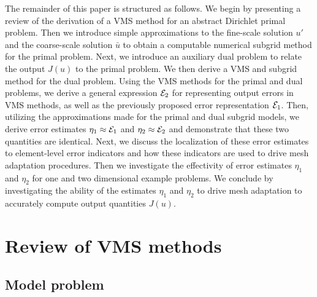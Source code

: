 The remainder of this paper is structured as follows.
We begin by presenting a review of the derivation
of a VMS method for an abstract Dirichlet primal problem.
Then we introduce simple approximations to the fine-scale
solution $u'$ and the coarse-scale solution $\bar{u}$
to obtain a computable numerical subgrid method for
the primal problem. Next, we introduce an auxiliary
dual problem to relate the output $J(u)$ to the primal
problem. We then derive a VMS and subgrid method for the
dual problem. Using the VMS methods for the primal and
dual problems, we derive a general expression $\mathcal{E}_2$ for
representing output errors in VMS methods, as well as
the previously proposed error representation $\mathcal{E}_1$.
Then, utilizing the approximations made for the primal
and dual subgrid models, we derive error estimates
$\eta_1 \approx \mathcal{E}_1$ and $\eta_2 \approx \mathcal{E}_2$
and demonstrate that these two quantities are identical.
Next, we discuss the localization of these error estimates
to element-level error indicators and how these indicators
are used to drive mesh adaptation procedures. Then we
investigate the effectivity of
error estimates $\eta_1$ and $\eta_2$ for one and
two dimensional example problems. We conclude by
investigating the ability of the estimates $\eta_1$
and $\eta_2$ to drive mesh adaptation to accurately
compute output quantities $J(u)$.

\section{Review of VMS methods}

\subsection{Model problem}

